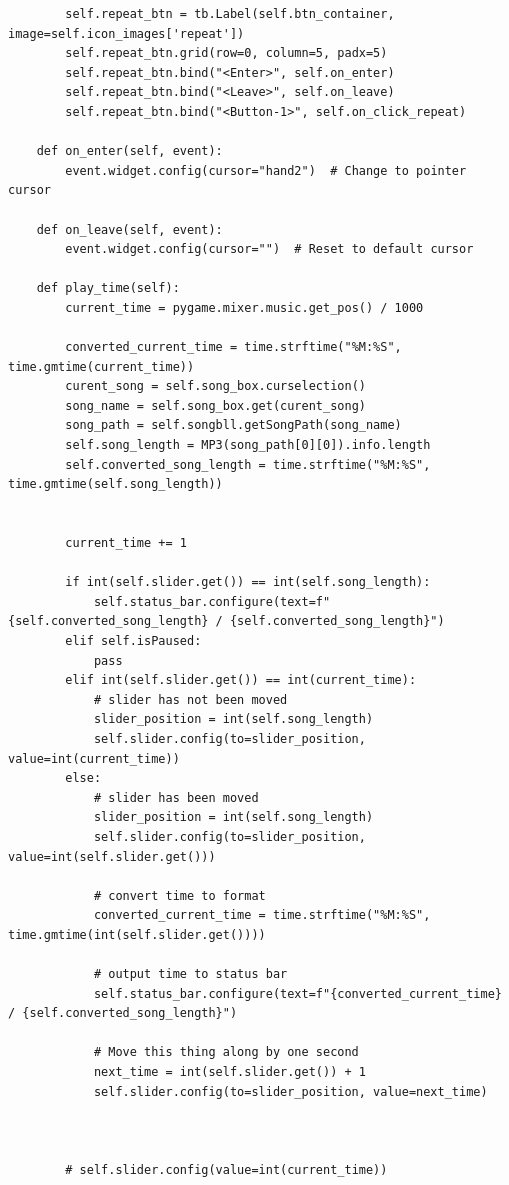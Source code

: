\documentclass[a4paper]{article}
\begin{document}
\begin{mdframed}[hidealllines=true,backgroundcolor=magenta!10]
\begin{lstlisting}
        self.repeat_btn = tb.Label(self.btn_container, image=self.icon_images['repeat'])
        self.repeat_btn.grid(row=0, column=5, padx=5)
        self.repeat_btn.bind("<Enter>", self.on_enter)
        self.repeat_btn.bind("<Leave>", self.on_leave)
        self.repeat_btn.bind("<Button-1>", self.on_click_repeat)

    def on_enter(self, event):
        event.widget.config(cursor="hand2")  # Change to pointer cursor

    def on_leave(self, event):
        event.widget.config(cursor="")  # Reset to default cursor

    def play_time(self):
        current_time = pygame.mixer.music.get_pos() / 1000

        converted_current_time = time.strftime("%M:%S", time.gmtime(current_time))
        curent_song = self.song_box.curselection()
        song_name = self.song_box.get(curent_song)
        song_path = self.songbll.getSongPath(song_name)
        self.song_length = MP3(song_path[0][0]).info.length
        self.converted_song_length = time.strftime("%M:%S", time.gmtime(self.song_length))


        current_time += 1

        if int(self.slider.get()) == int(self.song_length):
            self.status_bar.configure(text=f"{self.converted_song_length} / {self.converted_song_length}")
        elif self.isPaused:
            pass
        elif int(self.slider.get()) == int(current_time):
            # slider has not been moved
            slider_position = int(self.song_length)
            self.slider.config(to=slider_position, value=int(current_time))
        else:
            # slider has been moved
            slider_position = int(self.song_length)
            self.slider.config(to=slider_position, value=int(self.slider.get()))

            # convert time to format
            converted_current_time = time.strftime("%M:%S", time.gmtime(int(self.slider.get())))

            # output time to status bar 
            self.status_bar.configure(text=f"{converted_current_time} / {self.converted_song_length}")

            # Move this thing along by one second
            next_time = int(self.slider.get()) + 1
            self.slider.config(to=slider_position, value=next_time)



        # self.slider.config(value=int(current_time))



\end{lstlisting}
\end{mdframed}
\end{document}

